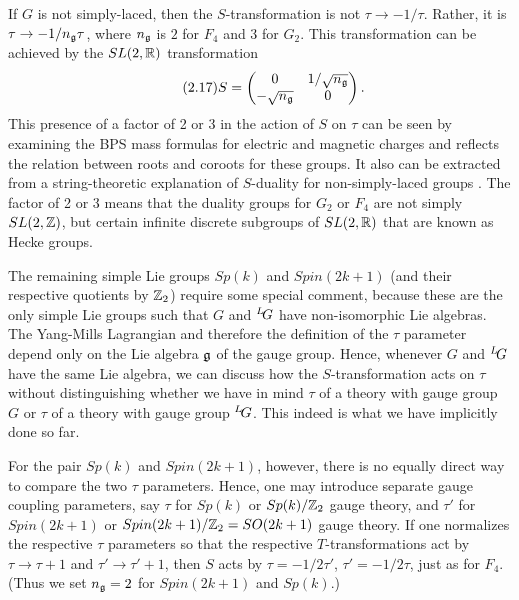 If $G$ is not simply-laced, then the $S$-transformation is not
$\tau\to -1/\tau$.  Rather, it is $\tau\to -1/n_{\frak g}\tau$,
where $n_{\frak g}$ is $2$ for $F_4$ and 3 for $G_2$.  This
transformation can be achieved by the $SL(2,\Bbb{R})$
transformation %
\begin{equation*}
\tag*{(2.17)}
S=\left(\begin{matrix} 0 & 1/\sqrt {n_{\frak
g}}\\ -\sqrt {n_{\frak g}} & 0\\\end{matrix}\right).
\end{equation*}
 This presence of a
factor of 2 or 3 in the action of $S$ on $\tau$ can be seen
\cite{ref46,ref47} by examining the BPS mass formulas for
electric and magnetic charges
 and reflects the relation between roots and
coroots for these groups. It also can be extracted from a
string-theoretic explanation of $S$-duality for non-simply-laced
groups \cite{ref48}. The factor of 2 or 3 means that the duality
groups for $G_2$ or $F_4$ are not simply $SL(2,\Bbb{Z})$, but
certain infinite discrete subgroups of $SL(2,\Bbb{R})$ that are
known as Hecke groups.

The remaining simple Lie groups $Sp(k)$ and $Spin(2k+1)$ (and
their respective quotients by $\Bbb{Z}_2$) require some special
comment, because these are the only simple Lie groups such that
$G$ and $^L\negthinspace G$ have non-isomorphic Lie algebras.  The
Yang-Mills Lagrangian and therefore the definition of the $\tau$
parameter depend only on the Lie algebra $\frak g$ of the gauge
group. Hence, whenever $G$ and $^L\negthinspace G$ have the same
Lie algebra, we can discuss how the $S$-transformation acts on
$\tau$ without distinguishing whether we have in mind $\tau$ of a
theory with gauge group $G$ or $\tau$ of a theory with gauge group
$^L\negthinspace G$. This indeed is what we have implicitly done
so far.

For the pair $Sp(k)$ and $Spin(2k+1)$, however, there is no
equally direct way to compare the two $\tau$ parameters.  Hence,
one may introduce separate gauge coupling parameters, say $\tau$
for $Sp(k)$ or $Sp(k)/\Bbb{Z}_2$ gauge theory, and $\tau'$ for
$Spin(2k+1)$ or $Spin(2k+1)/\Bbb{Z}_2=SO(2k+1)$ gauge theory. If
one normalizes the respective $\tau$ parameters so that the
respective $T$-transformations act by $\tau\to \tau+1$ and
$\tau'\to\tau'+1$, then $S$ acts by $\tau=-1/2\tau'$, $\tau'=
-1/2\tau$, just as for $F_4$.  (Thus we set $n_{\frak g}=2$ for
$Spin(2k+1)$ and $Sp(k)$.)

